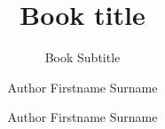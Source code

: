 \begin{titlepage}%

  \title{Book title}
  \subtitle{Book Subtitle}
  \titlepagerule


  \author{Author Firstname  Surname}
  \address{Author Address}

  \author{Author Firstname  Surname}
  \address{Author Address}

\end{titlepage}
